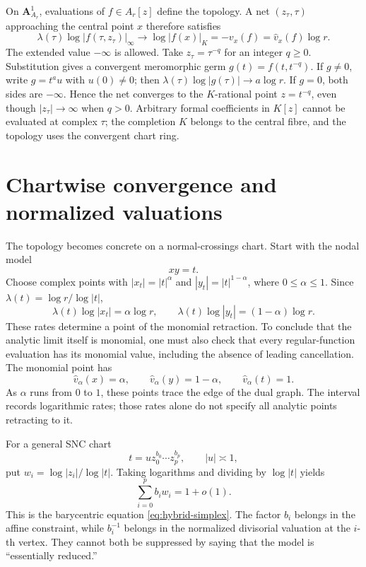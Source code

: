 \begin{example}
\label{ex:hybrid-affine-line}
On $\mathbf A^1_{A_r}$, evaluations of $f\in A_r[z]$ define the topology. A net $(z_\tau,\tau)$ approaching the central point $x$ therefore satisfies
\[
 \lambda(\tau)\log|f(\tau,z_\tau)|_\infty
       \longrightarrow\log|f(x)|_K
       =-v_x(f)=\widehat v_x(f)\log r.
\tag{66.9}\label{eq:hybrid-polynomial-test}
\]
The extended value $-\infty$ is allowed. Take $z_\tau=\tau^{-q}$ for an integer $q\geq0$. Substitution gives a convergent meromorphic germ $g(t)=f(t,t^{-q})$. If $g\ne0$, write $g=t^a u$ with $u(0)\ne0$; then $\lambda(\tau)\log|g(\tau)|\to a\log r$. If $g=0$, both sides are $-\infty$. Hence the net converges to the $K$-rational point $z=t^{-q}$, even though $|z_\tau|\to\infty$ when $q>0$. Arbitrary formal coefficients in $K[z]$ cannot be evaluated at complex $\tau$; the completion $K$ belongs to the central fibre, and the topology uses the convergent chart ring.
\end{example}

\section{Chartwise convergence and normalized valuations}
\label{sec:hybrid-chartwise-convergence}

The topology becomes concrete on a normal-crossings chart.  Start with the
nodal model
\[
                         xy=t.
\tag{66.10}\label{eq:hybrid-node-chart}
\]
Choose complex points with
$|x_t|=|t|^\alpha$ and
$|y_t|=|t|^{1-\alpha}$, where $0\leq\alpha\leq1$.  Since
$\lambda(t)=\log r/\log|t|$,
\[
 \lambda(t)\log|x_t|=\alpha\log r,
 \qquad
 \lambda(t)\log|y_t|=(1-\alpha)\log r.
\tag{66.11}\label{eq:hybrid-node-evaluation}
\]
These rates determine a point of the monomial retraction. To conclude
that the analytic limit itself is monomial, one must also check that every
regular-function evaluation has its monomial value, including the absence
of leading cancellation. The monomial point has
\[
 \widehat v_\alpha(x)=\alpha,
 \qquad
 \widehat v_\alpha(y)=1-\alpha,
 \qquad
 \widehat v_\alpha(t)=1.
\tag{66.12}\label{eq:hybrid-node-monomial-valuation}
\]
As $\alpha$ runs from $0$ to $1$, these points trace the edge of the
dual graph.  The interval records logarithmic rates; those rates alone do not specify
all analytic points retracting to it.

For a general SNC chart
\[
                    t=u z_0^{b_0}\cdots z_p^{b_p},
                  \qquad |u|\asymp1,
\tag{66.13}\label{eq:hybrid-general-snc-chart}
\]
put $w_i=\log|z_i|/\log|t|$.  Taking logarithms and dividing by
$\log|t|$ yields
\[
                     \sum_{i=0}^pb_iw_i=1+o(1).
\tag{66.14}\label{eq:hybrid-chart-barycentric-limit}
\]
This is the barycentric equation
\eqref{eq:hybrid-simplex}.  The factor $b_i$ belongs in the affine
constraint, while $b_i^{-1}$ belongs in the normalized divisorial
valuation at the $i$-th vertex.  They cannot both be suppressed by saying
that the model is ``essentially reduced.''

